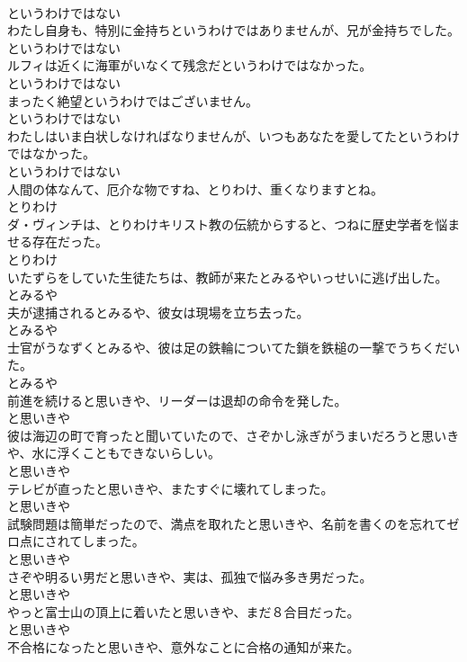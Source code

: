 \documentclass[8pt]{extreport}
\begin{document}
\begin{CJK}{UTF8}{min}
\\	というわけではない
\\	わたし自身も、特別に金持ちというわけではありませんが、兄が金持ちでした。	
\\	というわけではない
\\	ルフィは近くに海軍がいなくて残念だというわけではなかった。	
\\	というわけではない
\\	まったく絶望というわけではございません。	
\\	というわけではない
\\	わたしはいま白状しなければなりませんが、いつもあなたを愛してたというわけではなかった。	
\\	というわけではない
\\	人間の体なんて、厄介な物ですね、とりわけ、重くなりますとね。	
\\	とりわけ
\\	ダ・ヴィンチは、とりわけキリスト教の伝統からすると、つねに歴史学者を悩ませる存在だった。	
\\	とりわけ
\\	いたずらをしていた生徒たちは、教師が来たとみるやいっせいに逃げ出した。	
\\	とみるや
\\	夫が逮捕されるとみるや、彼女は現場を立ち去った。	
\\	とみるや
\\	士官がうなずくとみるや、彼は足の鉄輪についてた鎖を鉄槌の一撃でうちくだいた。	
\\	とみるや
\\	前進を続けると思いきや、リーダーは退却の命令を発した。	
\\	と思いきや
\\	彼は海辺の町で育ったと聞いていたので、さぞかし泳ぎがうまいだろうと思いきや、水に浮くこともできないらしい。	
\\	と思いきや
\\	テレビが直ったと思いきや、またすぐに壊れてしまった。	
\\	と思いきや
\\	試験問題は簡単だったので、満点を取れたと思いきや、名前を書くのを忘れてゼロ点にされてしまった。	
\\	と思いきや
\\	さぞや明るい男だと思いきや、実は、孤独で悩み多き男だった。	
\\	と思いきや
\\	やっと富士山の頂上に着いたと思いきや、まだ８合目だった。	
\\	と思いきや
\\	不合格になったと思いきや、意外なことに合格の通知が来た。	

\end{CJK}
\end{document}
